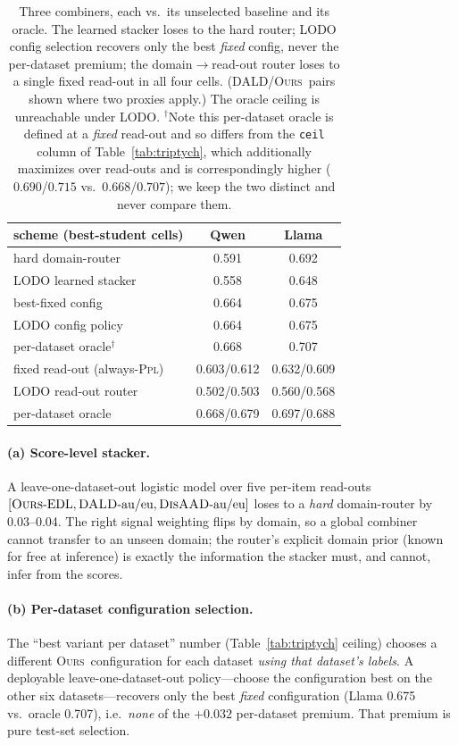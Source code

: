\documentclass[11pt]{article}
\newcommand{\ours}{\textsc{Ours}}
\newcommand{\dald}{\textsc{DALD}}
\newcommand{\disaad}{\textsc{DisAAD}}
\newcommand{\ppl}{\textsc{Ppl}}
\begin{document}
\begin{table}[t]\centering\small
\setlength{\tabcolsep}{4pt}
\begin{tabular}{l cc}
\toprule
scheme (best-student cells) & Qwen & Llama\\
\midrule
hard domain-router          & 0.591 & 0.692\\
\quad LODO learned stacker  & 0.558 & 0.648\\
\addlinespace
best-fixed config           & 0.664 & 0.675\\
\quad LODO config policy     & 0.664 & 0.675\\
\quad per-dataset oracle$^{\dagger}$ & 0.668 & 0.707\\
\addlinespace
fixed read-out (always-\ppl)& 0.603/0.612 & 0.632/0.609\\
\quad LODO read-out router  & 0.502/0.503 & 0.560/0.568\\
\quad per-dataset oracle     & 0.668/0.679 & 0.697/0.688\\
\bottomrule
\end{tabular}
\caption{Three combiners, each vs.\ its unselected baseline and its oracle. The learned
stacker loses to the hard router; LODO config selection recovers only the best
\emph{fixed} config, never the per-dataset premium; the domain$\to$read-out router loses
to a single fixed read-out in all four cells. (\dald/\ours\ pairs shown where two
proxies apply.) The oracle ceiling is unreachable under LODO. $^{\dagger}$Note this
per-dataset oracle is defined at a \emph{fixed} read-out and so differs from the
\texttt{ceil} column of Table~\ref{tab:triptych}, which additionally maximizes over
read-outs and is correspondingly higher ($0.690$/$0.715$ vs.\ $0.668$/$0.707$); we keep the
two distinct and never compare them.}
\label{tab:lodo}
\end{table}

\paragraph{(a) Score-level stacker.} A leave-one-dataset-out logistic model over five
per-item read-outs $[\text{\ours-EDL},\text{\dald-au/eu},\text{\disaad-au/eu}]$ loses to
a \emph{hard} domain-router by 0.03--0.04. The right signal weighting flips by domain, so
a global combiner cannot transfer to an unseen domain; the router's explicit domain
prior (known for free at inference) is exactly the information the stacker must, and
cannot, infer from the scores.

\paragraph{(b) Per-dataset configuration selection.} The ``best variant per dataset''
number (Table~\ref{tab:triptych} ceiling) chooses a different \ours\ configuration for
each dataset \emph{using that dataset's labels}. A deployable leave-one-dataset-out
policy---choose the configuration best on the other six datasets---recovers only the
best \emph{fixed} configuration (Llama 0.675 vs.\ oracle 0.707), i.e.\ \emph{none} of the
$+0.032$ per-dataset premium. That premium is pure test-set selection.
\end{document}
